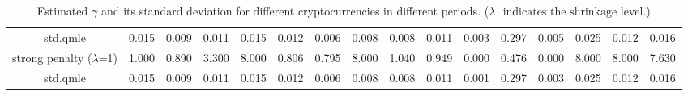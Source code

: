 \begin{spacing}{1.5}
\begin{landscape}
\begin{table}[]
{\begin{tabular}{|c|ccc|ccc|ccc|ccc|ccc|}
\rowcolor[HTML]{C0C0C0} 
std.qmle & 0.015 & 0.009 & 0.011 & 0.015 & 0.012 & 0.006 & 0.008 & 0.008 & 0.011 & 0.003 & 0.297 & 0.005 & 0.025 & 0.012 & 0.016 \\ \cline{1-1}
strong penalty ($\lambda$=1) & 1.000 & 0.890 & 3.300 & 8.000 & 0.806 & 0.795 & 8.000 & 1.040 & 0.949 & 0.000 & 0.476 & 0.000 & 8.000 & 8.000 & 7.630 \\ \cline{1-1}
\rowcolor[HTML]{C0C0C0} 
std.qmle & 0.015 & 0.009 & 0.011 & 0.015 & 0.012 & 0.006 & 0.008 & 0.008 & 0.011 & 0.001 & 0.297 & 0.003 & 0.025 & 0.012 & 0.016 \\ \hline
\end{tabular}
}
\caption{Estimated $\gamma$ and its standard deviation for different cryptocurrencies in different periods. ($\lambda$ $\text{ indicates the shrinkage level.}$)}

\label{result}
\end{table}

\begin{table}[]
\centering


\end{table}
\end{landscape}
\end{spacing}
